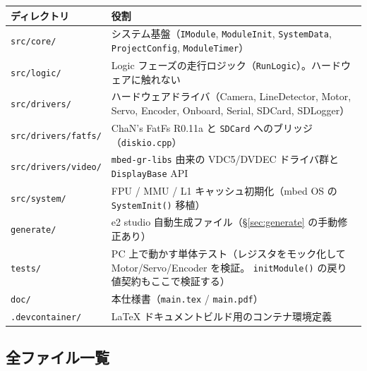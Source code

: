 \documentclass[a4paper,11pt,dvipdfmx]{jsarticle}
\begin{document}
\begin{tabularx}{\textwidth}{l X}
\toprule
\textbf{ディレクトリ} & \textbf{役割} \\
\midrule
\texttt{src/core/}    & システム基盤（\texttt{IModule}, \texttt{ModuleInit}, \texttt{SystemData}, \texttt{ProjectConfig}, \texttt{ModuleTimer}） \\
\texttt{src/logic/}   & Logic フェーズの走行ロジック（\texttt{RunLogic}）。ハードウェアに触れない \\
\texttt{src/drivers/} & ハードウェアドライバ（Camera, LineDetector, Motor, Servo, Encoder, Onboard, Serial, SDCard, SDLogger） \\
\texttt{src/drivers/fatfs/} & ChaN's FatFs R0.11a と \texttt{SDCard} へのブリッジ（\texttt{diskio.cpp}） \\
\texttt{src/drivers/video/} & \texttt{mbed-gr-libs} 由来の VDC5/DVDEC ドライバ群と \texttt{DisplayBase} API \\
\texttt{src/system/}  & FPU / MMU / L1 キャッシュ初期化（mbed OS の \texttt{SystemInit()} 移植） \\
\texttt{generate/}    & e2 studio 自動生成ファイル（\hyperref[sec:generate]{§\ref*{sec:generate}} の手動修正あり） \\
\texttt{tests/}       & PC 上で動かす単体テスト（レジスタをモック化して Motor/Servo/Encoder を検証。
  \texttt{initModule()} の戻り値契約もここで検証する） \\
\texttt{doc/}         & 本仕様書（\texttt{main.tex} / \texttt{main.pdf}） \\
\texttt{.devcontainer/} & LaTeX ドキュメントビルド用のコンテナ環境定義 \\
\bottomrule
\end{tabularx}

\subsection{全ファイル一覧}
\end{document}
